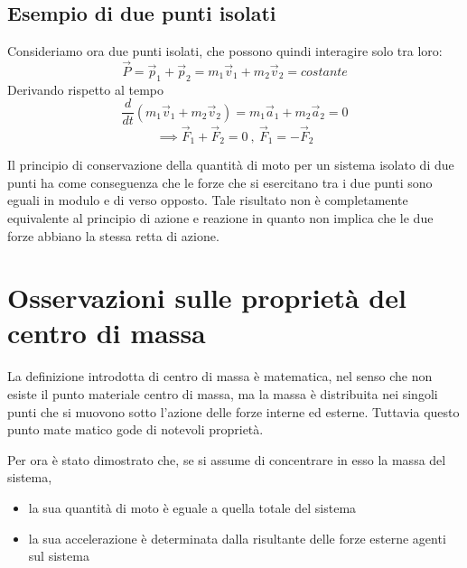 \documentclass[class=book, crop=false, oneside, 12pt]{standalone}
\begin{document}
\subsection{Esempio di due punti isolati}

Consideriamo ora due punti isolati, che possono quindi interagire solo tra loro: 
\begin{equation}
    \overrightarrow{P} = \overrightarrow{p}_1 + \overrightarrow{p}_2 = m_1 \overrightarrow{v}_1 + m_2 \overrightarrow{v}_2 = costante
\end{equation}
Derivando rispetto al tempo
\begin{equation*}
    \frac{d}{dt} \left(m_1 \overrightarrow{v}_1 + m_2 \overrightarrow{v}_2\right) = m_1 \overrightarrow{a}_1 + m_2 \overrightarrow{a}_2 = 0 
\end{equation*}
\begin{equation*}
    \implies \overrightarrow{F}_1 + \overrightarrow{F}_2 = 0 \ , \ \overrightarrow{F}_1 = - \overrightarrow{F}_2
\end{equation*}

Il principio di conservazione della quantità di moto per un sistema isolato di due punti ha come conseguenza che le forze che si esercitano tra i due punti sono eguali in modulo e di verso opposto.
Tale risultato non è completamente equivalente al principio di azione e reazione in quanto non implica che le due forze abbiano la stessa retta di azione.

\section{Osservazioni sulle proprietà del centro di massa}

La definizione introdotta di centro di massa è matematica, nel senso che non esiste il punto materiale centro di massa, ma la massa è distribuita nei singoli punti che si muovono sotto l'azione delle forze interne ed esterne. 
Tuttavia questo punto mate matico gode di notevoli proprietà.

Per ora è stato dimostrato che, se si assume di concentrare in esso la massa del sistema, 
\begin{itemize}
    \item la sua quantità di moto è eguale a quella totale del sistema
    \item la sua accelerazione è determinata dalla risultante delle forze esterne agenti sul sistema
\end{itemize}
\end{document}
